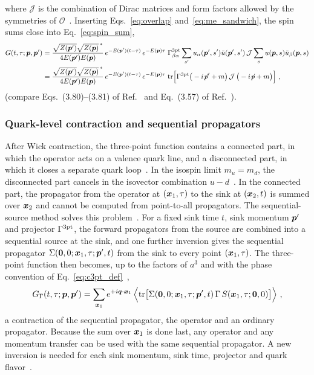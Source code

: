 where $\mathcal J$ is the combination of Dirac matrices and form factors allowed by the symmetries of $\mathcal O$~\cite{Lin:2014}. Inserting Eqs.~\eqref{eq:overlap} and~\eqref{eq:me_sandwich}, the spin sums close into Eq.~\eqref{eq:spin_sum},
\begingroup\footnotesize
\begin{align}
    G(t,\tau;\boldsymbol{p},\boldsymbol{p}')&=\frac{\sqrt{Z(\boldsymbol{p}')}\sqrt{Z(\boldsymbol{p})}^{\,*}}{4E(\boldsymbol{p}')E(\boldsymbol{p})}\,e^{-E(\boldsymbol{p}')(t-\tau)}\,e^{-E(\boldsymbol{p})\tau}\;
    \Gamma^{\rm 3pt}_{\beta\alpha}\sum_{s'}u_\alpha(\boldsymbol{p}',s')\bar u(\boldsymbol{p}',s')\,\mathcal J\sum_s u(\boldsymbol{p},s)\bar u_\beta(\boldsymbol{p},s) \nonumber\\
    &=\frac{\sqrt{Z(\boldsymbol{p}')}\sqrt{Z(\boldsymbol{p})}^{\,*}}{4E(\boldsymbol{p}')E(\boldsymbol{p})}\,e^{-E(\boldsymbol{p}')(t-\tau)}\,e^{-E(\boldsymbol{p})\tau}\;
    \mathrm{tr}\Big[\Gamma^{\rm 3pt}\big(-i{\not\!p}'+m\big)\,\mathcal J\,\big(-i{\not\!p}+m\big)\Big] \ ,
    \label{eq:c3pt_ground}
\end{align}
\endgroup
(compare Eqs.~(3.80)--(3.81) of Ref.~\cite{Lin:2014} and Eq.~(3.57) of Ref.~\cite{MuschThesis2}).

\subsubsection{Quark-level contraction and sequential propagators}
After Wick contraction, the three-point function contains a connected part, in which the operator acts on a valence quark line, and a disconnected part, in which it closes a separate quark loop~\cite{Lin:2014}. In the isospin limit $m_u=m_d$, the disconnected part cancels in the isovector combination $u-d$~\cite{Boussarie:2023izj,Yoon:2017qzo}. In the connected part, the propagator from the operator at $(\boldsymbol{x}_1,\tau)$ to the sink at $(\boldsymbol{x}_2,t)$ is summed over $\boldsymbol{x}_2$ and cannot be computed from point-to-all propagators. The sequential-source method solves this problem~\cite{Lin:2014}. For a fixed sink time $t$, sink momentum $\boldsymbol{p}'$ and projector $\Gamma^{\rm 3pt}$, the forward propagators from the source are combined into a sequential source at the sink, and one further inversion gives the sequential propagator $\Sigma(\boldsymbol{0},0;\boldsymbol{x}_1,\tau;\boldsymbol{p}',t)$ from the sink to every point $(\boldsymbol{x}_1,\tau)$. The three-point function then becomes, up to the factors of $a^3$ and with the phase convention of Eq.~\eqref{eq:c3pt_def}~\cite{Lin:2014},
\begin{equation}
    G_\Gamma(t,\tau;\boldsymbol{p},\boldsymbol{p}')=\sum_{\boldsymbol{x}_1}e^{+i\boldsymbol{q}\cdot\boldsymbol{x}_1}\,\Big\langle\mathrm{tr}\big[\Sigma(\boldsymbol{0},0;\boldsymbol{x}_1,\tau;\boldsymbol{p}',t)\,\Gamma\,S(\boldsymbol{x}_1,\tau;\boldsymbol{0},0)\big]\Big\rangle \ ,
    \label{eq:c3pt_sequential}
\end{equation}
a contraction of the sequential propagator, the operator and an ordinary propagator. Because the sum over $\boldsymbol{x}_1$ is done last, any operator and any momentum transfer can be used with the same sequential propagator. A new inversion is needed for each sink momentum, sink time, projector and quark flavor~\cite{Lin:2014,MuschThesis2}.

